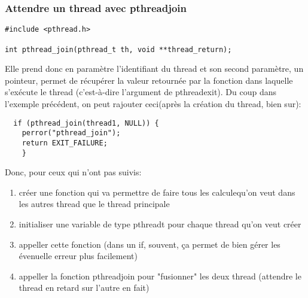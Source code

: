\documentclass[a4paper]{article}
\begin{document}
\subsubsection{Attendre un thread avec pthread\textunderscore{}join}
\begin{lstlisting}
#include <pthread.h>

int pthread_join(pthread_t th, void **thread_return);
\end{lstlisting}
Elle prend donc en paramètre l'identifiant du thread et son second paramètre, un pointeur, permet de récupérer la valeur retournée par la fonction dans laquelle s'exécute le thread (c'est-à-dire l'argument de pthread\textunderscore{}exit).\newline
Du coup dans l'exemple précédent, on peut rajouter ceci(après la création du thread, bien sur):
\begin{lstlisting}
  if (pthread_join(thread1, NULL)) {
    perror("pthread_join");
    return EXIT_FAILURE;
    }
\end{lstlisting}
Donc, pour ceux qui n'ont pas suivis:
\begin{enumerate}
  \item créer une fonction qui va permettre de faire tous les calculequ'on veut dans les autres thread que le thread principale
  \item initialiser une variable de type pthread\textunderscore{}t pour chaque thread qu'on veut créer
  \item appeller cette fonction (dans un if, souvent, ça permet de bien gérer les évenuelle erreur plus facilement)
  \item appeller la fonction pthread\textunderscore{}join pour "fusionner" les deux thread (attendre le thread en retard sur l'autre en fait)
\end{enumerate}
\end{document}
